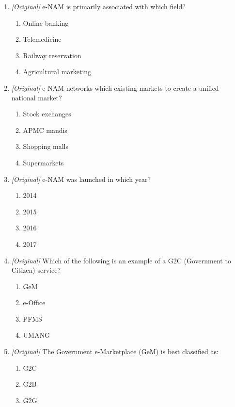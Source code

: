 \begin{enumerate}[label=\textbf{Q\arabic*.}, leftmargin=*]
\begin{enumerate}[label=\Alph*.]
    \item Government to Community
    \item Government to Citizen
    \item Government to Country
  \end{enumerate}
\item \textit{[Original]} e-NAM is primarily associated with which field?
  \begin{enumerate}[label=\Alph*.]
    \item Online banking
    \item Telemedicine
    \item Railway reservation
    \item Agricultural marketing
  \end{enumerate}
\item \textit{[Original]} e-NAM networks which existing markets to create a
  unified national market?
  \begin{enumerate}[label=\Alph*.]
    \item Stock exchanges
    \item APMC mandis
    \item Shopping malls
    \item Supermarkets
  \end{enumerate}
\item \textit{[Original]} e-NAM was launched in which year?
  \begin{enumerate}[label=\Alph*.]
    \item 2014
    \item 2015
    \item 2016
    \item 2017
  \end{enumerate}
\item \textit{[Original]} Which of the following is an example of a G2C
  (Government to Citizen) service?
  \begin{enumerate}[label=\Alph*.]
    \item GeM
    \item e-Office
    \item PFMS
    \item UMANG
  \end{enumerate}
\item \textit{[Original]} The Government e-Marketplace (GeM) is best
  classified as:
  \begin{enumerate}[label=\Alph*.]
    \item G2C
    \item G2B
    \item G2G

\end{enumerate}
\end{enumerate}
